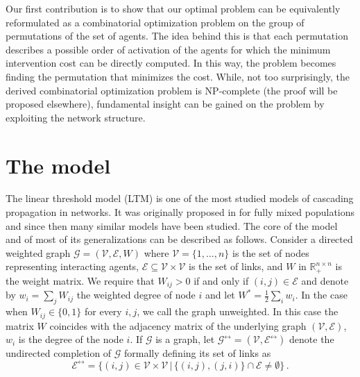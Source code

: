 \documentclass[12pt,twoside,reqno]{amsart}
\theoremstyle{definition}
\numberwithin{equation}{section}
\newcommand{\mc}{\mathcal}
\newcommand{\0}{\mathbf{0}}
\newcommand{\1}{\mathbf{1}}
\newcommand{\R}{\mathbb{R}}
\newcommand{\we}{W^*}
\begin{document}
Our first contribution is to show that our optimal problem can be equivalently reformulated as a combinatorial optimization problem on the group of permutations of the set of agents. The idea behind this is that each permutation describes a possible order of activation of the agents for which the minimum intervention cost can be directly computed. In this way, the problem becomes finding the permutation that minimizes the cost. While, not too surprisingly, the derived combinatorial optimization problem is NP-complete (the proof will be proposed elsewhere), fundamental insight can be gained on the problem by exploiting the network structure. 




\section{The model}\label{sec:model}
The linear threshold model (LTM) is one of the most studied models of cascading propagation in networks. It was originally proposed in \cite{mG:1978} for fully mixed populations and since then 
many similar models have been studied. 
The core of the model and of most of its generalizations can be described as follows.
Consider a directed weighted  graph $\mc G=(\mc V, \mc E, W)$ where $\mc V=\{1,\ldots,n\}$ is the set of nodes representing interacting agents, $\mc E\subseteq\mc  V\times \mc V$ is the set of links, and $W$ in $\R_+^{n\times n}$ is the weight matrix. 
We require that $W_{ij}>0$ if and only if $(i,j)\in\mc E$
and denote by $w_i=\sum_j W_{ij}$  the weighted degree of node $i$ and let $\we=\frac{1}{2}\sum_iw_i$. In the case when $W_{ij}\in\{0,1\}$ for every $i,j$, we call the graph unweighted. In this case the matrix $W$ coincides with the adjacency matrix of the underlying graph $(\mc V, \mc E)$, $w_i$ is the degree of the node $i$. If $\mc G$ is a graph, let $\mc G^{\leftrightarrow}=(\mc V,\mc E^{\leftrightarrow})$ denote the undirected completion of $\mc G$ formally defining its set of links as 
$$\mc E^{\leftrightarrow}=\{(i,j)\in\mc V\times\mc V\,|\, \{(i,j), (j,i)\}\cap\mc E\neq\emptyset\}\,.$$


\end{document}
